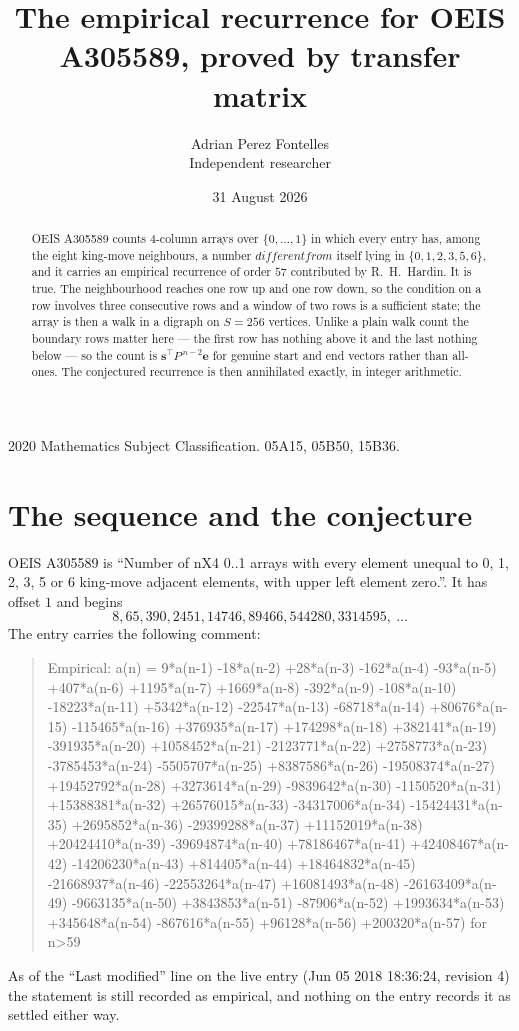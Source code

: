 \documentclass[11pt,a4paper]{article}
\title{The empirical recurrence for OEIS A305589, proved by transfer matrix}
\author{Adrian Perez Fontelles\\ \small Independent researcher}
\date{31 August 2026}
\theoremstyle{plain}
\theoremstyle{definition}
\begin{document}
\maketitle

\begin{abstract}
OEIS A305589 counts $4$-column arrays over $\{0,\dots,1\}$ in which every entry has,
among the eight king-move neighbours, a number $different from$ itself lying in $\{0,1,2,3,5,6\}$, and it carries an empirical
recurrence of order $57$ contributed by R.~H.~Hardin. It is true. The neighbourhood
reaches one row up and one row down, so the condition on a row involves three consecutive
rows and a window of two rows is a sufficient state; the array is then a walk in a digraph
on $S=256$ vertices. Unlike a plain walk count the boundary rows matter here --- the first
row has nothing above it and the last nothing below --- so the count is
$\mathbf{s}^{\!\top}P^{\,n-2}\mathbf{e}$ for genuine start and end vectors rather than
all-ones. The conjectured recurrence is then annihilated exactly, in integer arithmetic.
\end{abstract}

\noindent\small 2020 Mathematics Subject Classification. 05A15, 05B50, 15B36.\normalsize

\section{The sequence and the conjecture}

OEIS A305589 is ``Number of nX4 0..1 arrays with every element unequal to 0, 1, 2, 3, 5 or 6 king-move adjacent elements, with upper left element zero.''. It has offset
$1$ and begins
\[
8, 65, 390, 2451, 14746, 89466, 544280, 3314595,\ \dots
\]
The entry carries the following comment:
\begin{quote}\small
Empirical: a(n) = 9*a(n-1) -18*a(n-2) +28*a(n-3) -162*a(n-4) -93*a(n-5) +407*a(n-6) +1195*a(n-7) +1669*a(n-8) -392*a(n-9) -108*a(n-10) -18223*a(n-11) +5342*a(n-12) -22547*a(n-13) -68718*a(n-14) +80676*a(n-15) -115465*a(n-16) +376935*a(n-17) +174298*a(n-18) +382141*a(n-19) -391935*a(n-20) +1058452*a(n-21) -2123771*a(n-22) +2758773*a(n-23) -3785453*a(n-24) -5505707*a(n-25) +8387586*a(n-26) -19508374*a(n-27) +19452792*a(n-28) +3273614*a(n-29) -9839642*a(n-30) -1150520*a(n-31) +15388381*a(n-32) +26576015*a(n-33) -34317006*a(n-34) -15424431*a(n-35) +2695852*a(n-36) -29399288*a(n-37) +11152019*a(n-38) +20424410*a(n-39) -39694874*a(n-40) +78186467*a(n-41) +42408467*a(n-42) -14206230*a(n-43) +814405*a(n-44) +18464832*a(n-45) -21668937*a(n-46) -22553264*a(n-47) +16081493*a(n-48) -26163409*a(n-49) -9663135*a(n-50) +3843853*a(n-51) -87906*a(n-52) +1993634*a(n-53) +345648*a(n-54) -867616*a(n-55) +96128*a(n-56) +200320*a(n-57) for n>59
\end{quote}
As of the ``Last modified'' line on the live entry (Jun 05 2018 18:36:24, revision
4) the statement is still recorded as empirical, and nothing on the entry
records it as settled either way.
\end{document}
